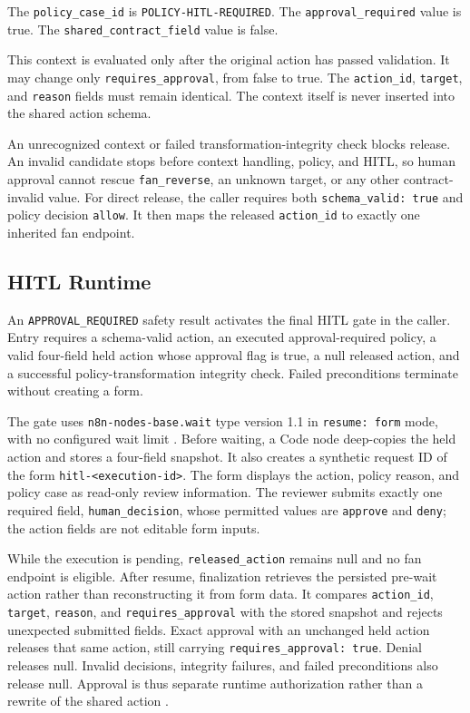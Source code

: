 The {\small\texttt{policy\_case\_id}} is
{\small\texttt{POLICY-HITL-REQUIRED}}. The
{\small\texttt{approval\_required}} value is true. The
{\small\texttt{shared\_contract\_field}} value is false.

This context is evaluated only after the original action has passed
validation. It may change only \texttt{requires\_approval}, from false to true.
The \texttt{action\_id}, \texttt{target}, and \texttt{reason} fields must
remain identical. The context itself is never inserted into the shared action
schema.

An unrecognized context or failed transformation-integrity check blocks
release. An invalid candidate stops before context handling, policy, and
HITL, so human approval cannot rescue \texttt{fan\_reverse}, an unknown
target, or any other contract-invalid value. For direct release, the caller
requires both \texttt{schema\_valid: true} and policy decision
\texttt{allow}. It then maps the released \texttt{action\_id} to exactly one
inherited fan endpoint.

\subsection{HITL Runtime}\label{subsec:impl-hitl}

An \texttt{APPROVAL\_REQUIRED} safety result activates the final HITL gate in
the caller. Entry requires a schema-valid action, an executed
approval-required policy, a valid four-field held action
whose approval flag is true, a null released action, and a successful
policy-transformation integrity check. Failed preconditions terminate without
creating a form.

The gate uses \texttt{n8n-nodes-base.wait} type version 1.1 in
\texttt{resume: form} mode, with no configured wait limit \cite{n8nWait}. Before waiting, a
Code node deep-copies the held action and stores a four-field snapshot. It
also creates a synthetic request ID of the form
\texttt{hitl-<execution-id>}. The form displays the action, policy reason, and
policy case as read-only review information. The reviewer submits exactly one
required field, \texttt{human\_decision}, whose permitted values are
\texttt{approve} and \texttt{deny}; the action fields are not editable form
inputs.

While the execution is pending, \texttt{released\_action} remains null and no
fan endpoint is eligible. After resume, finalization retrieves the persisted
pre-wait action rather than reconstructing it from form data. It compares
\texttt{action\_id}, \texttt{target}, \texttt{reason}, and
\texttt{requires\_approval} with the stored snapshot and rejects unexpected
submitted fields. Exact approval with an unchanged held action releases that
same action, still carrying \texttt{requires\_approval: true}. Denial releases
null. Invalid decisions, integrity failures, and failed preconditions also
release null. Approval is thus separate runtime authorization rather than a
rewrite of the shared action
\cite{amershi2019guidelines,nist2023airmf}.

